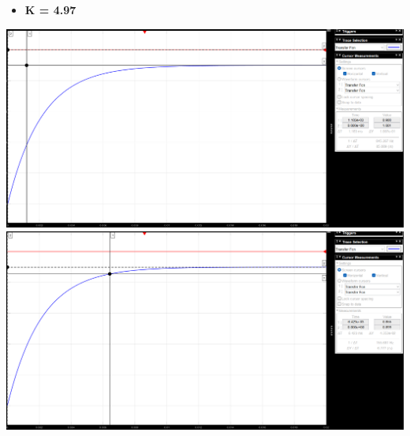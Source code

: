 \documentclass[12pt]{article}
\begin{document}
\begin{itemize}
    \item \bf \large K = 4.97
\end{itemize}
\begin{center}
    \includegraphics[width = 19 cm]{TP2 Simulink/Syst_1/Erreur statique_syst_1_K=4.97.png}
    \includegraphics[width = 19 cm]{TP2 Simulink/Syst_1/Reponse_indic_syst_1_K=4.97_tr5prct.png}

\end{center}
\end{document}
